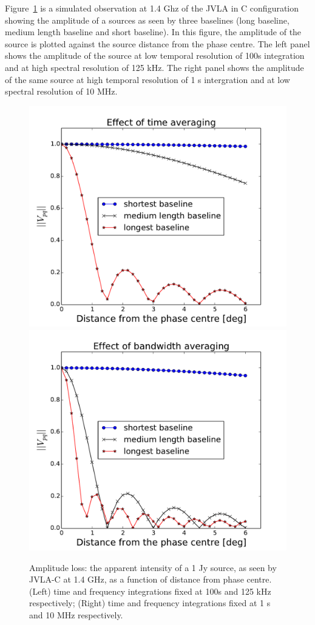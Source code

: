\documentclass[useAMS,usenatbib]{mn2e}
\begin{document}
Figure~\ref{fig:amplitude} is a simulated observation at 1.4 Ghz of the JVLA in C configuration showing the amplitude 
of a sources as seen by three  baselines (long baseline, medium length baseline and short baseline). In this figure, 
the amplitude of the source is plotted against the source distance from the phase centre. The left panel shows the amplitude of the source 
at low temporal resolution of 100s integration and at high spectral resolution of  125 kHz. The right panel shows
the amplitude of the same source at high temporal resolution  of 1 s intergration and at low spectral resolution  of 10 MHz. 
\begin{figure}
\includegraphics[width=\columnwidth]{./Figures/effect_time_averaging_amplitude.pdf}%
\includegraphics[width=\columnwidth]{./Figures/effect_bandwidth_averaging_amplitude.pdf}
\caption{Amplitude loss: the apparent intensity of a 1 Jy source, as seen by JVLA-C at 1.4 GHz, 
as a function of distance from phase centre. (Left) time and frequency integrations fixed at  100s and 125 kHz respectively; 
(Right) time and frequency integrations fixed at  1 s and 10 MHz respectively.}\label{fig:amplitude}
\end{figure}
\end{document}
